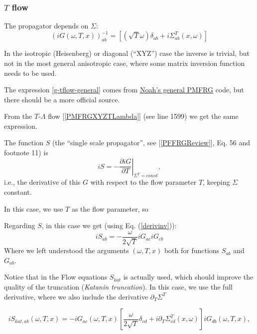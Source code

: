 \documentclass{article}
\begin{document}
\subsubsection{$T$ flow}
The propagator depends on $\Sigma$:
\begin{equation}
  \label{g-tflow-general}
  {(iG(\omega,T,x))}^{-1}_{ab} = \left[\left(\sqrt{T} \omega\right) \delta_{ab} +  i\Sigma^T_{ab}(x,\omega) \right]
\end{equation}

In the isotropic (Heisenberg) or diagonal (``XYZ'') case
the inverse is trivial, but not in the most general anisotropic case,
where some matrix inversion function needs to be used.

The expression \ref{g-tflow-general} comes from
\href{https://github.com/NoahHassan/pmfrg\_xyz/blob/1824a2bf7811b5276eee6d8d7f40087b5d8a4c15/src/PMFRG_general.jl\#L146-L159}{Noah's general PMFRG}
code, but there should be a more official source.

From the $T$-$\Lambda$ flow [\ref{PMFRGXYZTLambda}] (see line 1599) we get the same expression.

The function $S$ (the ``single scale propagator'', see [\ref{PFFRGReview}], Eq. 56 and footnote 11)
is
\begin{equation}
  iS = -\left. \frac{\partial iG}{\partial T} \right|_{\Sigma^T = const} ,
\end{equation}
i.e., the derivative of this $G$ with respect to the flow parameter $T$, keeping $\Sigma$ constant.

In this case, we use $T$ as the flow parameter, so

Regarding $S$, in this case we get (using Eq. (\ref{derivinv})):
\begin{equation}
  iS_{ab} = -\frac{\omega}{2\sqrt{T}} iG_{ac} iG_{cb}
\end{equation}
Where we left understood the arguments $(\omega,T,x)$ both for functions $S_{ab}$ and $G_{ab}$.

Notice that in the Flow equations $S_{kat}$ is actually used,
which should improve the quality of the truncation (\emph{Katanin truncation}).
In this case, we use the full derivative,
where we also include the derivative $\partial_T \Sigma^T$

\begin{equation}
  iS_{kat,ab}(\omega,T,x) = -iG_{ac}(\omega,T,x) \left[\frac{\omega}{2\sqrt{T}}\delta_{cd} + i\partial_T \Sigma^T_{cd}(x,\omega) \right]iG_{db}(\omega,T,x),
\end{equation}
\end{document}
